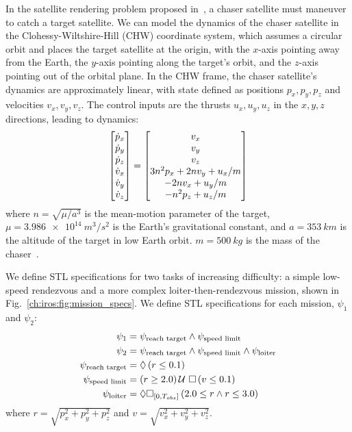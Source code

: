 In the satellite rendering problem proposed in~\cite{jewisonSpacecraftBenchmarkProblem2016}, a chaser satellite must maneuver to catch a target satellite. We can model the dynamics of the chaser satellite in the Clohessy-Wiltshire-Hill (CHW) coordinate system, which assumes a circular orbit and places the target satellite at the origin, with the $x$-axis pointing away from the Earth, the $y$-axis pointing along the target's orbit, and the $z$-axis pointing out of the orbital plane. In the CHW frame, the chaser satellite's dynamics are approximately linear, with state defined as positions $p_x, p_y, p_z$ and velocities $v_x, v_y, v_z$. The control inputs are the thrusts $u_x, u_y, u_z$ in the $x, y, z$ directions, leading to dynamics:
\begin{align*}
	\begin{bmatrix}\dot{p}_x              \\ \dot{p}_y \\ \dot{p}_z \\ \dot{v}_x \\ \dot{v}_y \\ \dot{v}_z\end{bmatrix} = \begin{bmatrix}
	v_x                         \\
	v_y                         \\
	v_z                         \\
	3n^2 p_x + 2n v_y + u_x / m \\
	-2n v_x + u_y / m           \\
		-n^2 p_z + u_z / m
	\end{bmatrix}
\end{align*}
where $n = \sqrt{\mu / a^3}$ is the mean-motion parameter of the target, $\mu = \SI{3.986e14}{m^3/s^2}$ is the Earth's gravitational constant, and $a = \SI{353}{km}$ is the altitude of the target in low Earth orbit. $m = \SI{500}{kg}$ is the mass of the chaser~\cite{jewisonSpacecraftBenchmarkProblem2016}.

We define STL specifications for two tasks of increasing difficulty: a simple low-speed rendezvous and a more complex loiter-then-rendezvous mission, shown in Fig.~\ref{ch:iros:fig:mission_specs}. We define STL specifications for each mission, $\psi_1$ and $\psi_2$:
\begin{align*}
	\psi_1                   & = \psi_\text{reach target} \wedge \psi_\text{speed limit}                           \\
	\psi_2                   & = \psi_\text{reach target} \wedge \psi_\text{speed limit} \wedge \psi_\text{loiter} \\
	\psi_\text{reach target} & = \lozenge \left( r \leq 0.1 \right)                                                       \\
	\psi_\text{speed limit}  & = \left( r \geq 2.0 \right) \mathcal{U}\ \square \left( v \leq 0.1 \right)                                   \\
	\psi_\text{loiter}       & = \lozenge \square_{[0, T_{obs}]} \left( 2.0 \leq r \wedge r \leq 3.0 \right)
\end{align*}
where $r = \sqrt{p_x^2 + p_y^2 + p_z^2}$ and $v = \sqrt{v_x^2 + v_y^2 + v_z^2}$.

